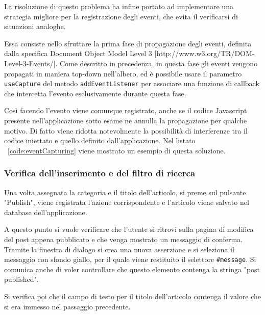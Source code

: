 

La risoluzione di questo problema ha infine portato ad implementare una strategia migliore per la registrazione degli eventi, che evita il verificarsi di situazioni analoghe.

Essa consiste nello sfruttare la prima fase di propagazione degli eventi, definita dalla specifica Document Object Model Level 3 [http://www.w3.org/TR/DOM-Level-3-Events/]. Come descritto in precedenza, in questa fase gli eventi vengono propagati in maniera top-down nell'albero, ed è possibile usare il parametro \verb|useCapture| del metodo \verb|addEventListener| per associare una funzione di callback che intercetta l'evento esclusivamente durante questa fase.

Così facendo l'evento viene comunque registrato, anche se il codice Javascript presente nell'applicazione sotto esame ne annulla la propagazione per qualche motivo. Di fatto viene ridotta notevolmente la possibilità di interferenze tra il codice iniettato e quello definito dall'applicazione. Nel listato ~\ref{code:eventCapturing} viene mostrato un esempio di questa soluzione.



\subsubsection{Verifica dell'inserimento e del filtro di ricerca}

Una volta assegnata la categoria e il titolo dell'articolo, si preme sul pulsante "Publish", viene registrata l'azione corrispondente e l'articolo viene salvato nel database dell'applicazione. 

A questo punto si vuole verificare che l'utente si ritrovi sulla pagina di modifica del post appena pubblicato e che venga mostrato un messaggio di conferma. Tramite la finestra di dialogo si crea una nuova asserzione e si seleziona il messaggio con sfondo giallo, per il quale viene restituito il selettore \verb|#message|. Si comunica anche di voler controllare che questo elemento contenga la stringa "post published".

Si verifica poi che il campo di testo per il titolo dell'articolo contenga il valore che si era immesso nel passaggio precedente.

